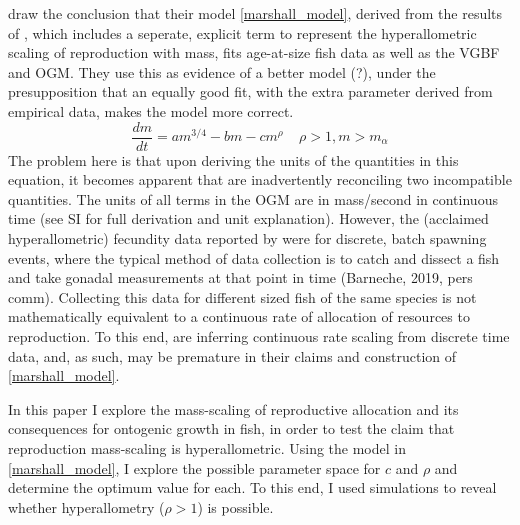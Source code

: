 \documentclass[a4paper]{article} %
\begin{document}
        \cite{Marshall2019b} draw the conclusion that their model \eqref{marshall_model}, derived from the results of \cite{Barneche2018d}, which includes a seperate, explicit term to represent the hyperallometric scaling of reproduction with mass, fits age-at-size fish data as well as the VGBF and \cite{West2001} OGM. They use this as evidence of a better model (?), under the presupposition that an equally good fit, with the extra parameter derived from empirical data, makes the model more correct. 
            \begin{equation}
                \frac{dm}{dt} = am^{3/4} - bm - cm^{\rho} \ \ \ \ \ \rho > 1, m > m_{\alpha} \label{marshall_model}
            \end{equation}        
        The problem here is that upon deriving the units of the quantities in this equation, it becomes apparent that \cite{Marshall2019b} are inadvertently reconciling two incompatible quantities. The units of all terms in the OGM are in mass/second in continuous time (see SI for full derivation and unit explanation). However, the (acclaimed hyperallometric) fecundity data reported by \cite{Barneche2018d} were for discrete, batch spawning events, where the typical method of data collection is to catch and dissect a fish and take gonadal measurements at that point in time (Barneche, 2019, pers comm). Collecting this data for different sized fish of the same species is not mathematically equivalent to a continuous rate of allocation of resources to reproduction. To this end, \cite{Marshall2019b} are inferring continuous rate scaling from discrete time data, and, as such, may be premature in their claims and construction of \eqref{marshall_model}. 
        
        In this paper I explore the mass-scaling of reproductive allocation and its consequences for ontogenic growth in fish, in order to test the claim that reproduction mass-scaling is hyperallometric. Using the model in \eqref{marshall_model}, I explore the possible parameter space for $c$ and $\rho$ and determine the optimum value for each. To this end, I used simulations to reveal whether hyperallometry ($\rho > 1$) is possible. 
        
\end{document}
